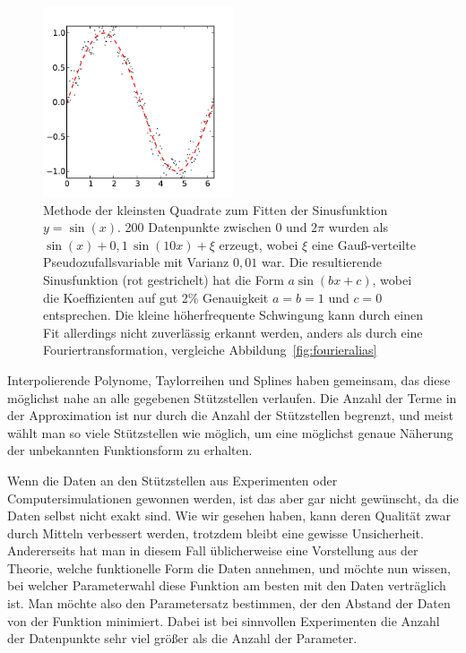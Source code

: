 \begin{figure}
  \centering
  \includegraphics[width=0.5\textwidth]{plots/leastsq}
  \caption{Methode der kleinsten Quadrate zum Fitten der Sinusfunktion
    $y=\sin(x)$. 200 Datenpunkte zwischen 0 und $2\pi$ wurden als
    $\sin(x) + 0,1\,\sin(10 x) + \xi$ erzeugt, wobei $\xi$ eine
    Gauß-verteilte Pseudozufallsvariable mit Varianz $0,01$ war. Die
    resultierende Sinusfunktion (rot gestrichelt) hat die Form $a
    \sin(bx+c)$, wobei die Koeffizienten auf gut 2\% Genauigkeit
    $a=b=1$ und $c=0$ entsprechen. Die kleine höherfrequente
    Schwingung kann durch einen Fit allerdings nicht zuverlässig
    erkannt werden, anders als durch eine Fouriertransformation,
    vergleiche Abbildung~\ref{fig:fourieralias}}
  \label{fig:leastsq}
\end{figure}

Interpolierende Polynome, Taylorreihen und Splines haben gemeinsam,
das diese möglichst nahe an alle gegebenen Stützstellen verlaufen. Die
Anzahl der Terme in der Approximation ist nur durch die Anzahl der
Stützstellen begrenzt, und meist wählt man so viele Stützstellen wie
möglich, um eine möglichst genaue Näherung der unbekannten
Funktionsform zu erhalten.

Wenn die Daten an den Stützstellen aus Experimenten oder
Computersimulationen gewonnen werden, ist das aber gar nicht
gewünscht, da die Daten selbst nicht exakt sind. Wie wir gesehen
haben, kann deren Qualität zwar durch Mitteln verbessert werden,
trotzdem bleibt eine gewisse Unsicherheit.  Andererseits hat man in
diesem Fall üblicherweise eine Vorstellung aus der Theorie, welche
funktionelle Form die Daten annehmen, und möchte nun wissen, bei
welcher Parameterwahl diese Funktion am besten mit den Daten
verträglich ist. Man möchte also den Parametersatz bestimmen, der den
Abstand der Daten von der Funktion minimiert. Dabei ist bei sinnvollen
Experimenten die Anzahl der Datenpunkte sehr viel größer als die
Anzahl der Parameter.

